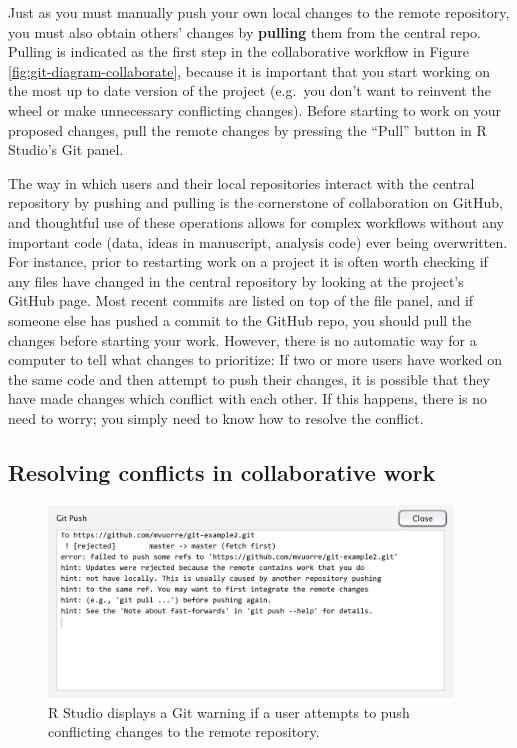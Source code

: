 \documentclass[
  american,
  ,doc,floatsintext]{apa6}
\begin{document}
Just as you must manually push your own local changes to the remote repository, you must also obtain others' changes by \textbf{pulling} them from the central repo. Pulling is indicated as the first step in the collaborative workflow in Figure \ref{fig:git-diagram-collaborate}, because it is important that you start working on the most up to date version of the project (e.g.~you don't want to reinvent the wheel or make unnecessary conflicting changes). Before starting to work on your proposed changes, pull the remote changes by pressing the ``Pull'' button in R Studio's Git panel.

The way in which users and their local repositories interact with the central repository by pushing and pulling is the cornerstone of collaboration on GitHub, and thoughtful use of these operations allows for complex workflows without any important code (data, ideas in manuscript, analysis code) ever being overwritten. For instance, prior to restarting work on a project it is often worth checking if any files have changed in the central repository by looking at the project's GitHub page. Most recent commits are listed on top of the file panel, and if someone else has pushed a commit to the GitHub repo, you should pull the changes before starting your work. However, there is no automatic way for a computer to tell what changes to prioritize: If two or more users have worked on the same code and then attempt to push their changes, it is possible that they have made changes which conflict with each other. If this happens, there is no need to worry; you simply need to know how to resolve the conflict.

\hypertarget{resolving-conflicts-in-collaborative-work}{%
\subsection{Resolving conflicts in collaborative work}\label{resolving-conflicts-in-collaborative-work}}

\begin{figure}

{\centering \includegraphics[width=4.23in]{images/rstudio-push-rejected} 

}

\caption{R Studio displays a Git warning if a user attempts to push conflicting changes to the remote repository.}\label{fig:rstudio-push-rejected}
\end{figure}
\end{document}
